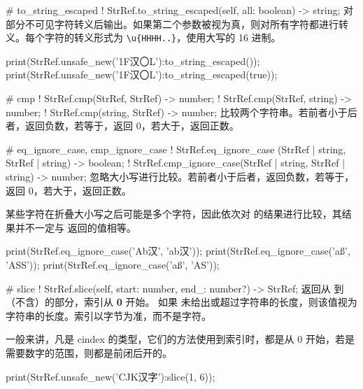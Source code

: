 \documentclass[class=article,doc={kv-usage}]{cusdoc}
\begin{document}
\begin{luadoc*}{}
# to_string_escaped
! StrRef.to_string_escaped(self, all: boolean) -> string;
对部分不可见字符转义后输出。如果第二个参数被视为真，则对所有字符都进行转义。每个字符的转义形式为 \verb|\u{HHHH..}|，使用大写的 16 进制。
\end{luadoc*}

\begin{luarun}{}
print(StrRef.unsafe_new('\x1F汉〇L'):to_string_escaped());
print(StrRef.unsafe_new('\x1F汉〇L'):to_string_escaped(true));
\end{luarun}

\begin{luadoc*}{}
# cmp
! StrRef.cmp(StrRef, StrRef) -> number;
! StrRef.cmp(StrRef, string) -> number;
! StrRef.cmp(string, StrRef) -> number;
比较两个字符串。若前者小于后者，返回负数，若等于，返回 0，若大于，返回正数。
\end{luadoc*}

\begin{luadoc*}{}
# eq_ignore_case, cmp_ignore_case
! StrRef.eq_ignore_case (StrRef | string, StrRef | string) -> boolean;
! StrRef.cmp_ignore_case(StrRef | string, StrRef | string) -> number;
忽略大小写进行比较。若前者小于后者，返回负数，若等于，返回 0，若大于，返回正数。

某些字符在折叠大小写之后可能是多个字符，因此依次对  的结果进行比较，其结果并不一定与  返回的值相等。
\end{luadoc*}

\begin{luarun}{}
print(StrRef.eq_ignore_case('Ab汉', 'ab汉'));
print(StrRef.eq_ignore_case('aß', 'ASS'));
print(StrRef.eq_ignore_case('aß', 'AS'));
\end{luarun}

\begin{luadoc*}{}
# slice
! StrRef.slice(self, start: number, end_: number?) -> StrRef;
返回从  到 （不含）的部分，索引从 \textbf{0} 开始。
如果  未给出或超过字符串的长度，则该值视为字符串的长度。索引以字节为准，而不是字符。

一般来讲，凡是 cindex 的类型，它们的方法使用到索引时，都是从 0 开始，若是需要数字的范围，则都是前闭后开的。
\end{luadoc*}

\begin{luarun}{}
print(StrRef.unsafe_new('CJK汉字'):slice(1, 6));
\end{luarun}
\end{document}
